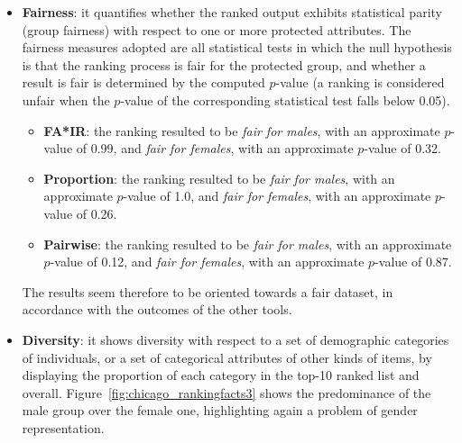 \begin{itemize}
\item \textbf{Fairness}: it quantifies whether the ranked output exhibits statistical parity (group fairness) with respect to one or more protected attributes. The fairness measures adopted are all statistical tests in which the null hypothesis is that the ranking process is fair for the protected group, and whether a result is fair is determined by the computed \(p\)-value (a ranking is considered unfair when the \(p\)-value of the corresponding statistical test falls below 0.05).
\begin{itemize}
\item \textbf{FA*IR}: the ranking resulted to be \textit{fair for males}, with an approximate \(p\)-value of 0.99, and \textit{fair for females}, with an approximate \(p\)-value of 0.32.
\item \textbf{Proportion}: the ranking resulted to be \textit{fair for males}, with an approximate \(p\)-value of 1.0, and \textit{fair for females}, with an approximate \(p\)-value of 0.26.
\item \textbf{Pairwise}: the ranking resulted to be \textit{fair for males}, with an approximate \(p\)-value of 0.12, and \textit{fair for females}, with an approximate \(p\)-value of 0.87.
\end{itemize}
The results seem therefore to be oriented towards a fair dataset, in accordance with the outcomes of the other tools.
\item \textbf{Diversity}: it shows diversity with respect to a set of demographic categories of individuals, or a set of categorical attributes of other kinds of items, by displaying the proportion of each category in the top-10 ranked list and overall. Figure~\ref{fig:chicago_rankingfacts3} shows the predominance of the male group over the female one, highlighting again a problem of gender representation.


\end{itemize}
